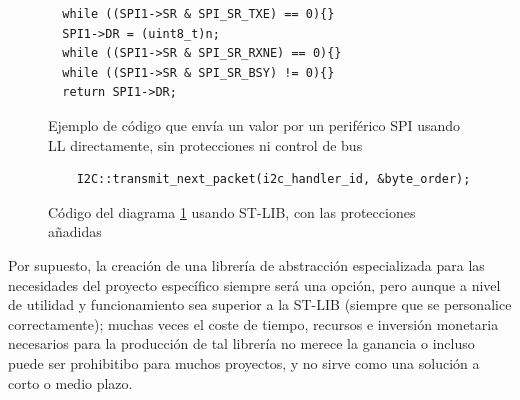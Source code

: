 \documentclass{report}
\begin{document}
\begin{figure}[h]
\begin{lstlisting}
  while ((SPI1->SR & SPI_SR_TXE) == 0){}
  SPI1->DR = (uint8_t)n;
  while ((SPI1->SR & SPI_SR_RXNE) == 0){}
  while ((SPI1->SR & SPI_SR_BSY) != 0){}
  return SPI1->DR;

  \end{lstlisting}
  \caption{Ejemplo de código que envía un valor por un periférico SPI usando LL directamente, sin protecciones ni control de bus}
  \label{LLSPICode}
\end{figure}

\begin{figure}[h]
  \begin{lstlisting}
    I2C::transmit_next_packet(i2c_handler_id, &byte_order);
    \end{lstlisting}
    \caption{Código del diagrama \ref{LLSPICode} usando ST-LIB, con las protecciones añadidas}
    \label{STLIBSPICode}
  \end{figure}
\par \vspace{0.3cm}

Por supuesto, la creación de una librería de abstracción especializada para las necesidades del proyecto específico siempre será una opción, pero aunque a nivel de utilidad y funcionamiento sea superior a la ST-LIB (siempre que se personalice correctamente); muchas veces el coste de tiempo, recursos e inversión monetaria necesarios para la producción de tal librería no merece la ganancia o incluso puede ser prohibitibo para muchos proyectos, y no sirve como una solución a corto o medio plazo. 
\end{document}
